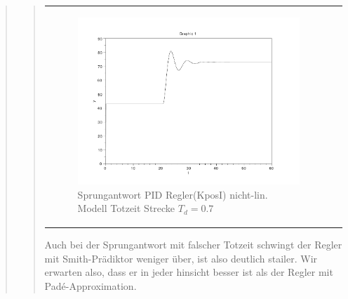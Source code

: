 \begin{quote}
\begin{quote}
\begin{center}
\begin{tabular}{ll}
                \begin{minipage}{0.6\textwidth}
                    \begin{figure}[H]
                        \includegraphics[scale=0.4,trim = 0cm 0cm 0cm
                        0cm, clip]
                        {./Bilder/4_5_Td_04_KposI}
                          \caption{Sprungantwort PID Regler(KposI) nicht-lin. Modell Totzeit Strecke $T_d = 0.7$ }
                    \end{figure}
                \end{minipage}
            
            \end{tabular}
        \end{center}
        \vspace{1em}
        
        
        Auch bei der Sprungantwort mit falscher Totzeit schwingt der Regler mit Smith-Prädiktor weniger über, ist also
        deutlich stailer.
        Wir erwarten also, dass er in jeder hinsicht besser ist als der Regler mit Pad\'e-Approximation.\\
        \vspace{1em}
        
    \end{quote}
    
    
    
\end{quote}



